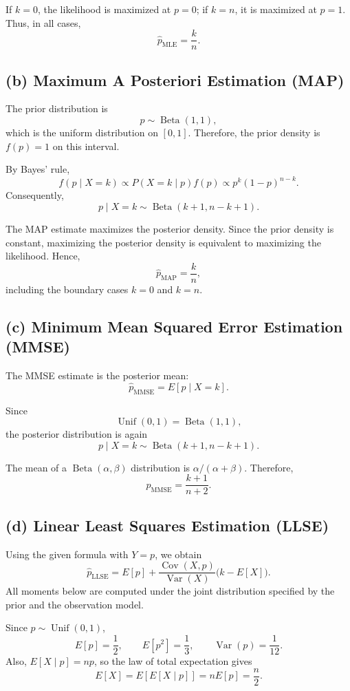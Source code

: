 \documentclass[11pt,a4paper]{article}
\begin{document}
If $k=0$, the likelihood is maximized at $p=0$; if $k=n$,
it is maximized at $p=1$. Thus, in all cases,
\[
\hat p_{\mathrm{MLE}}=\frac{k}{n}.
\]

\subsection*{(b) Maximum A Posteriori Estimation (MAP)}

The prior distribution is
\[
p\sim\operatorname{Beta}(1,1),
\]
which is the uniform distribution on $[0,1]$. Therefore,
the prior density is $f(p)=1$ on this interval.

By Bayes' rule,
\[
f(p\mid X=k)
\propto P(X=k\mid p)f(p)
\propto p^k(1-p)^{n-k}.
\]
Consequently,
\[
p\mid X=k\sim\operatorname{Beta}(k+1,n-k+1).
\]

The MAP estimate maximizes the posterior density. Since the prior
density is constant, maximizing the posterior density is equivalent
to maximizing the likelihood. Hence,
\[\hat p_{\mathrm{MAP}}=\frac{k}{n},
\]
including the boundary cases $k=0$ and $k=n$.

\subsection*{(c) Minimum Mean Squared Error Estimation (MMSE)}

The MMSE estimate is the posterior mean:
\[
\hat p_{\mathrm{MMSE}}=E[p\mid X=k].
\]

Since
\[
\operatorname{Unif}(0,1)=\operatorname{Beta}(1,1),
\]
the posterior distribution is again
\[
p\mid X=k\sim\operatorname{Beta}(k+1,n-k+1).
\]

The mean of a $\operatorname{Beta}(\alpha,\beta)$ distribution is
$\alpha/(\alpha+\beta)$. Therefore,
\[
\hat p_{\mathrm{MMSE}}=\frac{k+1}{n+2}.
\]

\subsection*{(d) Linear Least Squares Estimation (LLSE)}

Using the given formula with $Y=p$, we obtain
\[
\hat p_{\mathrm{LLSE}}
=
E[p]
+
\frac{\operatorname{Cov}(X,p)}{\operatorname{Var}(X)}
\bigl(k-E[X]\bigr).
\]
All moments below are computed under the joint distribution
specified by the prior and the observation model.

Since $p\sim\operatorname{Unif}(0,1)$,
\[
E[p]=\frac12,
\qquad
E[p^2]=\frac13,
\qquad
\operatorname{Var}(p)=\frac1{12}.
\]
Also, $E[X\mid p]=np$, so the law of total expectation gives
\[
E[X]=E[E[X\mid p]]=nE[p]=\frac n2.
\]
\end{document}
